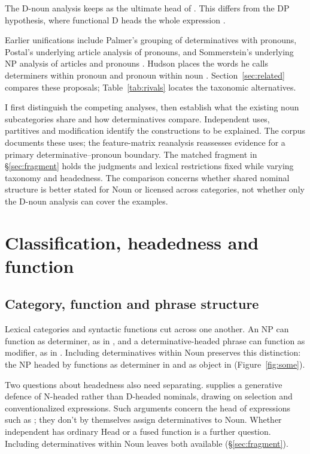 \documentclass[12pt]{article}
\begin{document}
The D-noun analysis keeps  as the ultimate head of . This differs from the DP hypothesis, where functional D heads the whole expression \citep{abney1987}.

Earlier unifications include Palmer's grouping of determinatives with pronouns, Postal's underlying article analysis of pronouns, and Sommerstein's underlying NP analysis of articles and pronouns \citep{palmer1924,postal1966,sommerstein1972}. Hudson places the words he calls determiners within pronoun and pronoun within noun \citep{hudson2004determiners,hudson2010wordgrammar}. Section~\ref{sec:related} compares these proposals; Table~\ref{tab:rivals} locates the taxonomic alternatives.

I first distinguish the competing analyses, then establish what the existing noun subcategories share and how determinatives compare. Independent uses, partitives and modification identify the constructions to be explained. The corpus documents these uses; the feature-matrix reanalysis reassesses evidence for a primary determinative--pronoun boundary. The matched fragment in §\ref{sec:fragment} holds the judgments and lexical restrictions fixed while varying taxonomy and headedness. The comparison concerns whether shared nominal structure is better stated for Noun or licensed across categories, not whether only the D-noun analysis can cover the examples.

\section{Classification, headedness and function}\label{sec:alternatives}

\subsection{Category, function and phrase structure}

Lexical categories and syntactic functions cut across one another. An NP can function as determiner, as in , and a determinative-headed phrase can function as modifier, as in  \citep{payne2010,pullummiller2022nps}. Including determinatives within Noun preserves this distinction: the NP headed by  functions as determiner in  and as object in  (Figure~\ref{fig:some}).

Two questions about headedness also need separating. \textcite{bruening2020nominal} supplies a generative defence of N-headed rather than D-headed nominals, drawing on selection and conventionalized expressions. Such arguments concern the head of expressions such as ; they don't by themselves assign determinatives to Noun. Whether independent  has ordinary Head or a fused function is a further question. Including determinatives within Noun leaves both available (§\ref{sec:fragment}).
\end{document}
